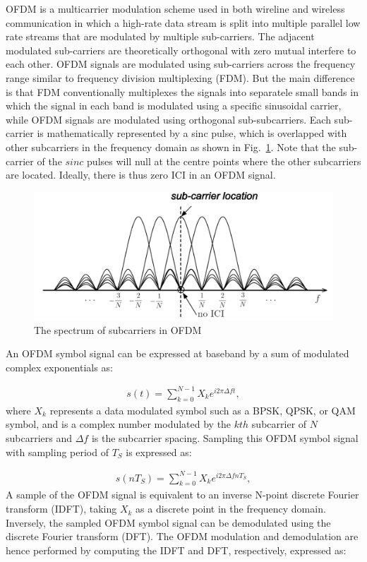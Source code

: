 OFDM is a multicarrier modulation scheme used in both wireline and wireless communication in which a high-rate data stream is split into multiple parallel low rate streams that are modulated by multiple sub-carriers.
The adjacent modulated sub-carriers are theoretically orthogonal with zero mutual interfere to each other.
OFDM signals are modulated using sub-carriers across the frequency range similar to frequency division multiplexing (FDM).
But the main difference is that FDM conventionally multiplexes the signals into separatele small bands in which the signal in each band is modulated using a specific sinusoidal carrier, while OFDM signals are modulated using orthogonal sub-subcarriers.
Each sub-carrier is mathematically represented by a sinc pulse, which is overlapped with other subcarriers in the frequency domain as shown in Fig.~\ref{fig:OFDM-subcarrier}.
Note that the sub-carrier of the $sinc$ pulses will null at the centre points where the other subcarriers are located. Ideally, there is thus zero ICI in an OFDM signal.

\begin{figure}
	\centerline{\includegraphics [width=0.8\columnwidth] {Figures/OFDM-subcarrier.pdf} }
	\caption{The spectrum of subcarriers in OFDM \cite{farhang2008signal}}
	\label{fig:OFDM-subcarrier}
\end{figure}

An OFDM symbol signal can be expressed at baseband by a sum of modulated complex exponentials as:

\begin{eqnarray}
\label{equ:OFDMsignal}
s(t) = \sum_{k=0}^{N-1} X_k e^{i2\pi\Delta ft},
\end{eqnarray}
where $X_{k}$ represents a data modulated symbol such as a BPSK, QPSK, or QAM symbol, and is a complex number modulated by the $kth$ subcarrier of $N$ subcarriers and $\Delta f$ is the subcarrier spacing.
Sampling this OFDM symbol signal with sampling period of $T_S$ is expressed as:

\begin{eqnarray}
\label{equ:sampledOFDMsignal}
s(nT_S) = \sum_{k=0}^{N-1} X_k e^{i2\pi\Delta fnT_S},
\end{eqnarray}
A sample of the OFDM signal is equivalent to an inverse N-point discrete Fourier transform (IDFT), taking $X_{k}$ as a discrete point in the frequency domain.
Inversely, the sampled OFDM symbol signal can be demodulated using the discrete Fourier transform (DFT). The OFDM modulation and demodulation are hence performed by computing the IDFT and DFT, respectively, expressed as:

